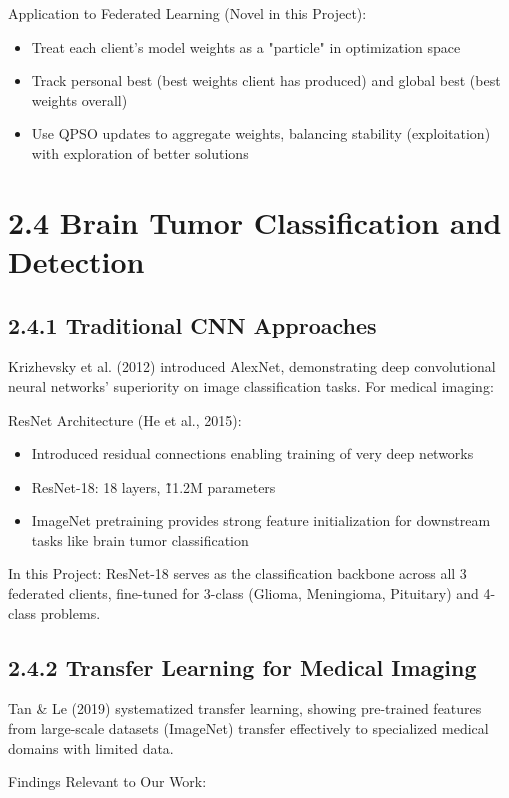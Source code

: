Application to Federated Learning (Novel in this Project):

\begin{itemize}
  \item Treat each client's model weights as a "particle" in optimization space
  \item Track personal best (best weights client has produced) and global best (best weights overall)
  \item Use QPSO updates to aggregate weights, balancing stability (exploitation) with exploration of better solutions
\end{itemize}


\section{2.4 Brain Tumor Classification and Detection}

\subsection{2.4.1 Traditional CNN Approaches}
Krizhevsky et al. (2012) introduced AlexNet, demonstrating deep convolutional neural networks' superiority on image classification tasks. For medical imaging:

ResNet Architecture (He et al., 2015):

\begin{itemize}
  \item Introduced residual connections enabling training of very deep networks
  \item ResNet-18: 18 layers, \~11.2M parameters
  \item ImageNet pretraining provides strong feature initialization for downstream tasks like brain tumor classification
\end{itemize}

In this Project: ResNet-18 serves as the classification backbone across all 3 federated clients, fine-tuned for 3-class (Glioma, Meningioma, Pituitary) and 4-class problems.


\subsection{2.4.2 Transfer Learning for Medical Imaging}
Tan \& Le (2019) systematized transfer learning, showing pre-trained features from large-scale datasets (ImageNet) transfer effectively to specialized medical domains with limited data.

Findings Relevant to Our Work:

